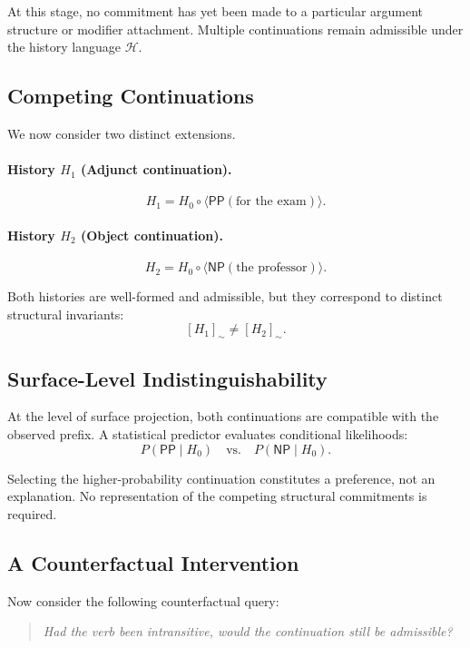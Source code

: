 \documentclass[11pt]{article}
\begin{document}
At this stage, no commitment has yet been made to a particular argument structure or modifier attachment. Multiple continuations remain admissible under the history language $\mathcal{H}$.

\subsection{Competing Continuations}

We now consider two distinct extensions.

\paragraph{History $H_1$ (Adjunct continuation).}
\[
H_1 = H_0 \circ \langle \mathsf{PP}(\text{for the exam}) \rangle.
\]

\paragraph{History $H_2$ (Object continuation).}
\[
H_2 = H_0 \circ \langle \mathsf{NP}(\text{the professor}) \rangle.
\]

Both histories are well-formed and admissible, but they correspond to distinct structural invariants:
\[
[H_1]_{\sim} \neq [H_2]_{\sim}.
\]

\subsection{Surface-Level Indistinguishability}

At the level of surface projection, both continuations are compatible with the observed prefix. A statistical predictor evaluates conditional likelihoods:
\[
P(\mathsf{PP} \mid H_0) \quad \text{vs.} \quad P(\mathsf{NP} \mid H_0).
\]

Selecting the higher-probability continuation constitutes a preference, not an explanation. No representation of the competing structural commitments is required.

\subsection{A Counterfactual Intervention}

Now consider the following counterfactual query:

\begin{quote}
\emph{Had the verb been intransitive, would the continuation still be admissible?}
\end{quote}
\end{document}
